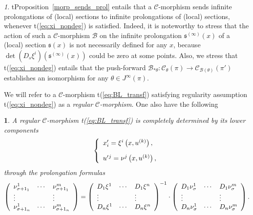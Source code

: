 \documentclass[12pt,english]{elsarticle}
\theoremstyle{plain}
\theoremstyle{plain}
\newtheorem{prop}[thm]{\protect\propositionname}
\theoremstyle{remark}
\newtheorem{rem}[thm]{\protect\remarkname}
\theoremstyle{plain}
\theoremstyle{definition}
\theoremstyle{definition}
\providecommand{\propositionname}{Proposition}
\providecommand{\remarkname}{Remark}
\begin{document}
%
\begin{rem}
\label{rem:morph_prol}
t{Proposition~\ref{morp_sends_prol}} entails that a $\mathcal{C}$-morphism
sends infinite prolongations of (local) sections to infinite prolongations
of (local) sections, whenever t{(\ref{eq:xi_nondeg})} is satisfied. Indeed,
it is noteworthy to stress that the action of such a $\mathcal{C}$-morphism
$\mathcal{B}$ on the infinite prolongation
$\mathfrak{s}^{(\infty )}(x)$ of a (local) section $\mathfrak{s}(x)$ is
not necessarily defined for any $x$, because
$\det \left (D_{s}\xi ^{i}\right )(\mathfrak{s}^{(\infty )}(x))$ could
be zero at some points. Also, we stress that t{(\ref{eq:xi_nondeg})} entails
that the push-forward
$\mathcal{B}_{*\theta}:\mathcal{C}_{\theta}(\pi )\rightarrow
\mathcal{C}_{\mathcal{B}(\theta )}(\pi ')$ establishes an isomorphism for
any $\theta \in J^{\infty}(\pi )$.
\end{rem}

We will refer to a $\mathcal{C}$-morphism t{(\ref{eq:BL_transf})} satisfying
regularity assumption t{(\ref{eq:xi_nondeg})} as a
\textit{regular $\mathcal{C}$-morphism}. One also have the following
%
\begin{prop}
\label{prop:3}%
A regular $\mathcal{C}$-morphism t{(\ref{eq:BL_transf})} is completely determined
by its lower components
%
\begin{equation*}
\left \{
%
\begin{array}{l}
x'_{i}=\xi ^{i}\left (x,u^{(k)}\right ),
\vspace{10pt}
\\
u'{}^{j}=\nu ^{j}\left (x,u^{(k)}\right ),
\end{array}
%
\right .
\end{equation*}
%
through the prolongation formulas
%
\begin{equation}
\left (
%
\begin{array}{l@{\quad}l@{\quad}l}
\nu _{\sigma +1_{1}}^{1} & \cdots & \nu _{\sigma +1_{1}}^{m}
\\
\vdots & & \vdots
\\
\nu _{\sigma +1_{n}}^{1} & \cdots & \nu _{\sigma +1_{n}}^{m}
\end{array}
%
\right )=\left (
%
\begin{array}{l@{\quad}l@{\quad}l}
D_{1}\xi ^{1} & \cdots & D_{1}\xi ^{n}
\\
\vdots & & \vdots
\\
D_{n}\xi ^{1} & \cdots & D_{n}\xi ^{n}
\end{array}
%
\right )^{-1}\cdot \left (
%
\begin{array}{l@{\quad}l@{\quad}l}
D_{1}\nu _{\sigma}^{1} & \cdots & D_{1}\nu _{\sigma}^{m}
\\
\vdots & & \vdots
\\
D_{n}\nu _{\sigma}^{1} & \cdots & D_{n}\nu _{\sigma}^{m}
\end{array}
%
\right ).
\label{Prol_mor}
\end{equation}
%
\end{prop}
\end{document}
